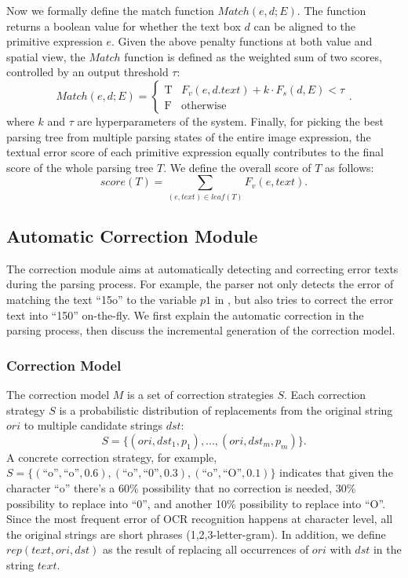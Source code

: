 Now we formally define the match function $Match(e, d; E)$.
The function returns a boolean value for whether the text box $d$
can be aligned to the primitive expression $e$.
Given the above penalty functions at both value and spatial view,
the $Match$ function is defined as the weighted sum of two scores,
controlled by an output threshold $\tau$:
\begin{equation}
Match(e, d; E) =
\begin{cases}
\text{T}& \text{$F_v(e, d.text)+k\cdot F_s(d, E) < \tau$}\\
\text{F}& \text{otherwise}
\end{cases}
.
\label{equ:match}
\end{equation}
\noindent
where $k$ and $\tau$ are hyperparameters of the system.
Finally, for picking the best parsing tree
from multiple parsing states of the entire image expression,
the textual error score of each primitive expression equally contributes
to the final score of the whole parsing tree $T$.
We define the overall score of $T$ as follows:
\begin{equation}
  score(T) = \sum_{(e,text) \in leaf(T)} F_v(e, text).
  \label{equ:overall}
\end{equation}


\subsection{Automatic Correction Module}
The correction module aims at automatically detecting and correcting
error texts during the parsing process.
For example, the parser not only detects the error of matching the text ``15o''
to the variable $p1$ in ,
but also tries to correct the error text into ``150'' on-the-fly.
We first explain the automatic correction in the parsing process,
then discuss the incremental generation of the correction model.

\subsubsection{Correction Model}
The correction model $M$ is a set of correction strategies $S$.
Each correction strategy $S$ is a probabilistic distribution of replacements
from the original string $ori$ to multiple candidate strings $dst$:
\begin{equation}
  S = \{(ori, dst_1, p_1), ..., (ori, dst_m, p_m)\}.
\end{equation}
\noindent
A concrete correction strategy, for example,
$S = \{(\text{``o''}, \text{``o''}, 0.6), (\text{``o''}, \text{``0''}, 0.3), (\text{``o''}, \text{``O''}, 0.1)\}$ indicates that given the character ``o''
there's a 60\% possibility that no correction is needed,
30\% possibility to replace into ``0'',
and another 10\% possibility to replace into ``O''.
Since the most frequent error of OCR recognition happens at character level,
all the original strings are short phrases (1,2,3-letter-gram).
In addition, we define $rep(text, ori, dst)$ as the result of
replacing all occurrences of $ori$ with $dst$ in the string $text$.

